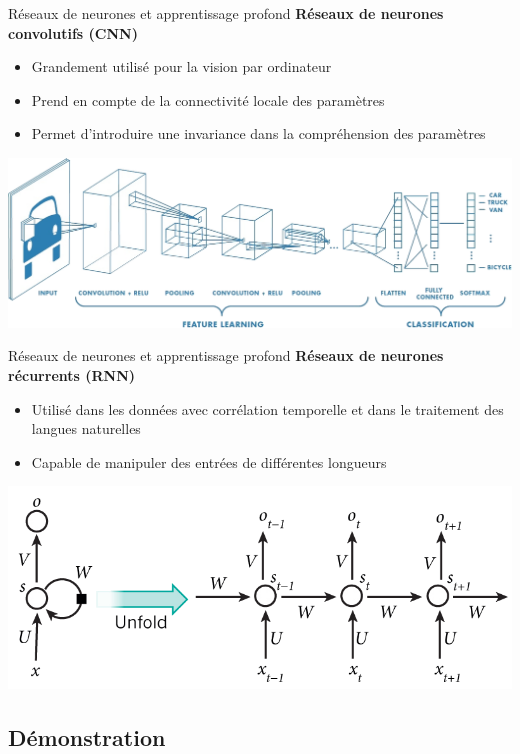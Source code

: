\documentclass[french]{beamer}
\begin{document}
\begin{frame}{Réseaux de neurones et apprentissage profond}
\textbf{Réseaux de neurones convolutifs (CNN)}
\begin{itemize}
	\item Grandement utilisé pour la vision par ordinateur
	\item Prend en compte de la connectivité locale des paramètres
	\item Permet d'introduire une invariance dans la compréhension des paramètres
	
\end{itemize}
\begin{center}
\includegraphics[width=.8\textwidth]{figures/convnet}
\end{center}
\end{frame}

\begin{frame}{Réseaux de neurones et apprentissage profond}
\textbf{Réseaux de neurones récurrents (RNN)}
\begin{itemize}
	\item Utilisé dans les données avec corrélation temporelle et dans le traitement des langues naturelles
	\item Capable de manipuler des entrées de différentes longueurs
\end{itemize}
\begin{center}
\includegraphics[width=.8\textwidth]{figures/rnn}
\end{center}
\end{frame}

\subsection{Démonstration}
\end{document}
